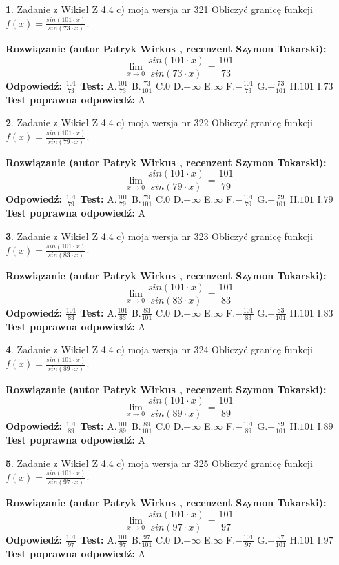 \documentclass[12pt, a4paper]{article}
\theoremstyle{definition} %
\newtheorem{zad}{}
\newcommand{\zadStart}[1]{\begin{zad}#1\newline}
\newcommand{\zadStop}{\end{zad}}
\newcommand{\rozwStart}[2]{\noindent \textbf{Rozwiązanie (autor #1 , recenzent #2): }\newline}
\newcommand{\rozwStop}{\newline}
\newcommand{\odpStart}{\noindent \textbf{Odpowiedź:}\newline}
\newcommand{\odpStop}{\newline}
\newcommand{\testStart}{\noindent \textbf{Test:}\newline}
\newcommand{\testStop}{\newline}
\newcommand{\kluczStart}{\noindent \textbf{Test poprawna odpowiedź:}\newline}
\newcommand{\kluczStop}{\newline}
\begin{document}
\zadStart{Zadanie z Wikieł Z 4.4 c) moja wersja nr 321}
Obliczyć granicę funkcji $f(x)=\frac{sin(101\cdot x)}{sin(73\cdot x)}$.
\zadStop
\rozwStart{Patryk Wirkus}{Szymon Tokarski}
$$\lim\limits_{x\to 0}\frac{sin(101\cdot x)}{sin(73\cdot x)}=
\frac{101}{73}$$
\rozwStop
\odpStart
$\frac{101}{73}$
\odpStop
\testStart
A.$\frac{101}{73}$
B.$\frac{73}{101}$
C.$0$
D.$-\infty$
E.$\infty$
F.$-\frac{101}{73}$
G.$-\frac{73}{101}$
H.$101$
I.$73$
\testStop
\kluczStart
A
\kluczStop



\zadStart{Zadanie z Wikieł Z 4.4 c) moja wersja nr 322}
Obliczyć granicę funkcji $f(x)=\frac{sin(101\cdot x)}{sin(79\cdot x)}$.
\zadStop
\rozwStart{Patryk Wirkus}{Szymon Tokarski}
$$\lim\limits_{x\to 0}\frac{sin(101\cdot x)}{sin(79\cdot x)}=
\frac{101}{79}$$
\rozwStop
\odpStart
$\frac{101}{79}$
\odpStop
\testStart
A.$\frac{101}{79}$
B.$\frac{79}{101}$
C.$0$
D.$-\infty$
E.$\infty$
F.$-\frac{101}{79}$
G.$-\frac{79}{101}$
H.$101$
I.$79$
\testStop
\kluczStart
A
\kluczStop



\zadStart{Zadanie z Wikieł Z 4.4 c) moja wersja nr 323}
Obliczyć granicę funkcji $f(x)=\frac{sin(101\cdot x)}{sin(83\cdot x)}$.
\zadStop
\rozwStart{Patryk Wirkus}{Szymon Tokarski}
$$\lim\limits_{x\to 0}\frac{sin(101\cdot x)}{sin(83\cdot x)}=
\frac{101}{83}$$
\rozwStop
\odpStart
$\frac{101}{83}$
\odpStop
\testStart
A.$\frac{101}{83}$
B.$\frac{83}{101}$
C.$0$
D.$-\infty$
E.$\infty$
F.$-\frac{101}{83}$
G.$-\frac{83}{101}$
H.$101$
I.$83$
\testStop
\kluczStart
A
\kluczStop



\zadStart{Zadanie z Wikieł Z 4.4 c) moja wersja nr 324}
Obliczyć granicę funkcji $f(x)=\frac{sin(101\cdot x)}{sin(89\cdot x)}$.
\zadStop
\rozwStart{Patryk Wirkus}{Szymon Tokarski}
$$\lim\limits_{x\to 0}\frac{sin(101\cdot x)}{sin(89\cdot x)}=
\frac{101}{89}$$
\rozwStop
\odpStart
$\frac{101}{89}$
\odpStop
\testStart
A.$\frac{101}{89}$
B.$\frac{89}{101}$
C.$0$
D.$-\infty$
E.$\infty$
F.$-\frac{101}{89}$
G.$-\frac{89}{101}$
H.$101$
I.$89$
\testStop
\kluczStart
A
\kluczStop



\zadStart{Zadanie z Wikieł Z 4.4 c) moja wersja nr 325}
Obliczyć granicę funkcji $f(x)=\frac{sin(101\cdot x)}{sin(97\cdot x)}$.
\zadStop
\rozwStart{Patryk Wirkus}{Szymon Tokarski}
$$\lim\limits_{x\to 0}\frac{sin(101\cdot x)}{sin(97\cdot x)}=
\frac{101}{97}$$
\rozwStop
\odpStart
$\frac{101}{97}$
\odpStop
\testStart
A.$\frac{101}{97}$
B.$\frac{97}{101}$
C.$0$
D.$-\infty$
E.$\infty$
F.$-\frac{101}{97}$
G.$-\frac{97}{101}$
H.$101$
I.$97$
\testStop
\kluczStart
A
\kluczStop
\end{document}
